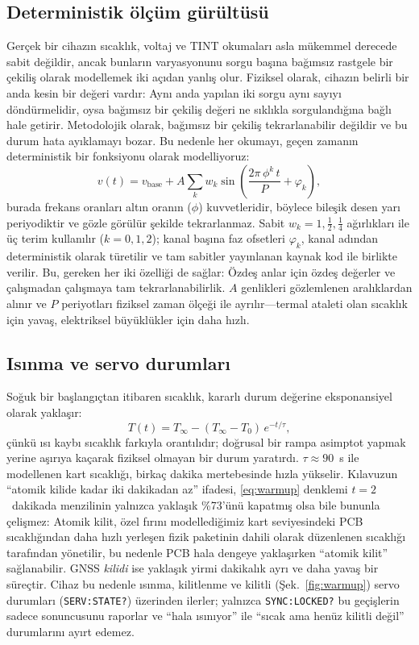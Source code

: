 \documentclass[9pt,twocolumn,a4paper]{extarticle}
\begin{document}
\subsection{Deterministik ölçüm gürültüsü}
Gerçek bir cihazın sıcaklık, voltaj ve TINT okumaları asla mükemmel derecede sabit değildir, ancak bunların varyasyonunu sorgu başına bağımsız rastgele bir çekiliş olarak modellemek iki açıdan yanlış olur. Fiziksel olarak, cihazın belirli bir anda kesin bir değeri vardır: Aynı anda yapılan iki sorgu aynı sayıyı döndürmelidir, oysa bağımsız bir çekiliş değeri ne sıklıkla sorgulandığına bağlı hale getirir. Metodolojik olarak, bağımsız bir çekiliş tekrarlanabilir değildir ve bu durum hata ayıklamayı bozar. Bu nedenle her okumayı, geçen zamanın deterministik bir fonksiyonu olarak modelliyoruz:
\begin{equation}
v(t) = v_{\mathrm{base}} + A \sum_{k} w_k
       \sin\!\left(\frac{2\pi\,\phi^{k}\,t}{P} + \varphi_k\right),
\label{eq:noise}
\end{equation}
burada frekans oranları altın oranın ($\phi$) kuvvetleridir, böylece bileşik desen yarı periyodiktir ve gözle görülür şekilde tekrarlanmaz. Sabit $w_k=1,\tfrac12,\tfrac14$ ağırlıkları ile üç terim kullanılır ($k=0,1,2$); kanal başına faz ofsetleri $\varphi_k$, kanal adından deterministik olarak türetilir ve tam sabitler yayınlanan kaynak kod ile birlikte verilir. Bu, gereken her iki özelliği de sağlar: Özdeş anlar için özdeş değerler ve çalışmadan çalışmaya tam tekrarlanabilirlik. $A$ genlikleri gözlemlenen aralıklardan alınır ve $P$ periyotları fiziksel zaman ölçeği ile ayrılır---termal ataleti olan sıcaklık için yavaş, elektriksel büyüklükler için daha hızlı.

\subsection{Isınma ve servo durumları}
\label{sec:warmup}
Soğuk bir başlangıçtan itibaren sıcaklık, kararlı durum değerine eksponansiyel olarak yaklaşır:
\begin{equation}
T(t) = T_\infty - (T_\infty - T_0)\,e^{-t/\tau},
\label{eq:warmup}
\end{equation}
çünkü ısı kaybı sıcaklık farkıyla orantılıdır; doğrusal bir rampa asimptot yapmak yerine aşırıya kaçarak fiziksel olmayan bir durum yaratırdı. $\tau\approx 90$~s ile modellenen kart sıcaklığı, birkaç dakika mertebesinde hızla yükselir. Kılavuzun ``atomik kilide kadar iki dakikadan az'' ifadesi, \eqref{eq:warmup} denklemi $t=2$~dakikada menzilinin yalnızca yaklaşık \%73'ünü kapatmış olsa bile bununla çelişmez: Atomik kilit, özel fırını modellediğimiz kart seviyesindeki PCB sıcaklığından daha hızlı yerleşen fizik paketinin dahili olarak düzenlenen sıcaklığı tarafından yönetilir, bu nedenle PCB hala dengeye yaklaşırken ``atomik kilit'' sağlanabilir. GNSS \emph{kilidi} ise yaklaşık yirmi dakikalık ayrı ve daha yavaş bir süreçtir. Cihaz bu nedenle ısınma, kilitlenme ve kilitli (Şek.~\ref{fig:warmup}) servo durumları (\texttt{SERV:STATE?}) üzerinden ilerler; yalnızca \texttt{SYNC:LOCKED?} bu geçişlerin sadece sonuncusunu raporlar ve ``hala ısınıyor'' ile ``sıcak ama henüz kilitli değil'' durumlarını ayırt edemez.
\end{document}
